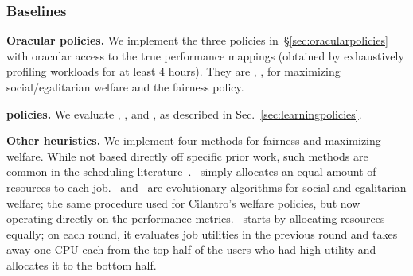 \subsubsection{Baselines}
\label{sec:baselinesfixedclus}
\vspace{-1mm}

\newcommand{\bstitle}[1]{\textbf{#1.}}
\bstitle{Oracular policies}
We implement the three policies
in~\S\ref{sec:oracularpolicies} with oracular
access to the true performance mappings (obtained by exhaustively profiling workloads for at least 4 hours).
They are \oraclesw, \oracleew,  for maximizing social/egalitarian welfare
and the \oraclenjcs fairness policy.

\bstitle{\cilantros policies}
We evaluate \cilantrosw, \cilantroew, and \cilantronjc, as described in
Sec.~\ref{sec:learningpolicies}.

\bstitle{Other heuristics}
We implement four methods for fairness and
maximizing  welfare.
While not based directly off specific prior work, such methods are common in the
scheduling literature~\cite{crankshaw2017clipper,grandl2016altruistic}. \equalshare~simply
allocates an equal amount of resources to each job. \evoalgsw~and \evoalgew~are evolutionary
algorithms for social and egalitarian welfare; the same procedure used for Cilantro's welfare
policies, but now operating directly on the performance metrics.
\greedyew~starts by
allocating resources equally;
on each round, it evaluates job utilities in the previous round and
takes away one CPU each from the top half of the users who had high utility 
and allocates it to the bottom half.


